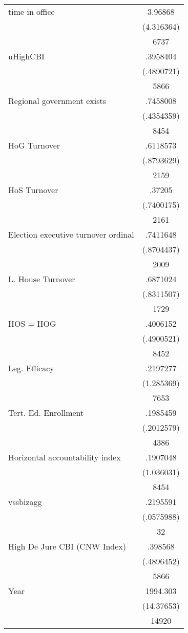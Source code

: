 {\begin{longtable}{l*{1}{c}}
time in office      &     3.96868\\
                    &  (4.316364)\\
                    &        6737\\
uHighCBI            &    .3958404\\
                    &  (.4890721)\\
                    &        5866\\
Regional government exists   &    .7458008\\
                    &  (.4354359)\\
                    &        8454\\
HoG Turnover        &    .6118573\\
                    &  (.8793629)\\
                    &        2159\\
HoS Turnover        &      .37205\\
                    &  (.7400175)\\
                    &        2161\\
Election executive turnover ordinal&    .7411648\\
                    &  (.8704437)\\
                    &        2009\\
L. House Turnover   &    .6871024\\
                    &  (.8311507)\\
                    &        1729\\
HOS = HOG           &    .4006152\\
                    &  (.4900521)\\
                    &        8452\\
Leg. Efficacy       &    .2197277\\
                    &  (1.285369)\\
                    &        7653\\
Tert. Ed. Enrollment&    .1985459\\
                    &  (.2012579)\\
                    &        4386\\
Horizontal accountability index&    .1907048\\
                    &  (1.036031)\\
                    &        8454\\
vssbizagg           &    .2195591\\
                    &  (.0575988)\\
                    &          32\\
High De Jure CBI (CNW Index)&     .398568\\
                    &  (.4896452)\\
                    &        5866\\
Year                &    1994.303\\
                    &  (14.37653)\\
                    &       14920\\
\hline\hline
\end{longtable}
}
